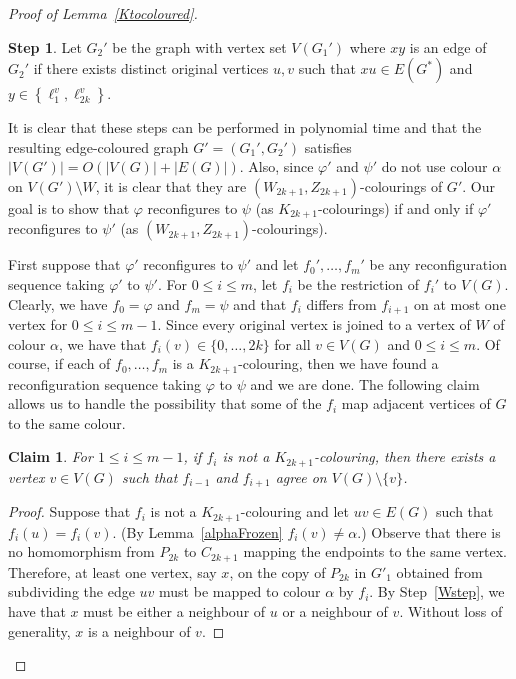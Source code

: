 \documentclass[11 pt]{amsart}
\newtheorem{claim}[equation]{Claim}
\theoremstyle{definition}
\theoremstyle{case}
\newtheorem{step}{Step}
\numberwithin{equation}{section}
\begin{document}
\begin{proof}[Proof of Lemma~\ref{Ktocoloured}]
\begin{step}
\label{freezingStep}
Let $G_2'$ be the graph with vertex set $V(G_1')$ where $xy$ is an edge of $G_2'$ if there exists distinct original vertices $u,v$ such that $xu\in E(G^*)$ and $y\in\left\{\ell_1^v,\ell_{2k}^v\right\}$.
\end{step}

It is clear that these steps can be performed in polynomial time and that the resulting edge-coloured graph $G'=(G_1',G_2')$ satisfies $|V(G')|=O\left(|V(G)|+|E(G)|\right)$. Also, since $\varphi'$ and $\psi'$ do not use colour $\alpha$ on $V(G')\setminus W$, it is clear that they are $(W_{2k+1},Z_{2k+1})$-colourings of $G'$. Our goal is to show that $\varphi$ reconfigures to $\psi$ (as $K_{2k+1}$-colourings) if and only if $\varphi'$ reconfigures to $\psi'$ (as $(W_{2k+1},Z_{2k+1})$-colourings). 

First suppose that $\varphi'$ reconfigures to $\psi'$ and let $f_0',\dots,f_m'$ be any reconfiguration sequence taking $\varphi'$ to $\psi'$. For $0\leq i\leq m$, let $f_i$ be the restriction of $f_i'$ to $V(G)$. Clearly, we have $f_0=\varphi$ and $f_m=\psi$ and that $f_i$ differs from $f_{i+1}$ on at most one vertex for $0\leq i\leq m-1$. Since every original vertex is joined to a vertex of $W$ of colour $\alpha$, we have  that  $f_i(v)\in \{0,\dots,2k\}$ for all $v\in V(G)$ and $0\leq i\leq m$. Of course, if each of $f_0,\dots,f_m$ is a $K_{2k+1}$-colouring, then we have found a reconfiguration sequence taking $\varphi$ to $\psi$ and we are done. The following claim allows us to handle the possibility that some of the $f_i$ map adjacent vertices of $G$ to the same colour. 

\begin{claim}
\label{restrictProper}
For $1\leq i\leq m-1$, if $f_i$ is not a $K_{2k+1}$-colouring, then there exists a vertex $v\in V(G)$ such that $f_{i-1}$ and $f_{i+1}$ agree on $V(G)\setminus\{v\}$. 
\end{claim}

\begin{proof}
Suppose that $f_i$ is not a $K_{2k+1}$-colouring and let $uv\in E(G)$ such that $f_i(u)=f_i(v)$. (By Lemma~\ref{alphaFrozen} $f_i(v) \neq \alpha$.) Observe that there is no homomorphism from $P_{2k}$ to $C_{2k+1}$ mapping the endpoints to the same vertex. Therefore, at least one vertex, say $x$, on the copy of $P_{2k}$ in $G'_1$ obtained from subdividing the edge $uv$ must be mapped to colour $\alpha$ by $f_i$. By Step~\ref{Wstep}, we have that $x$ must be either a neighbour of $u$ or a neighbour of $v$. Without loss of generality, $x$ is a neighbour of $v$. 


\end{proof}
\end{proof}
\end{document}
